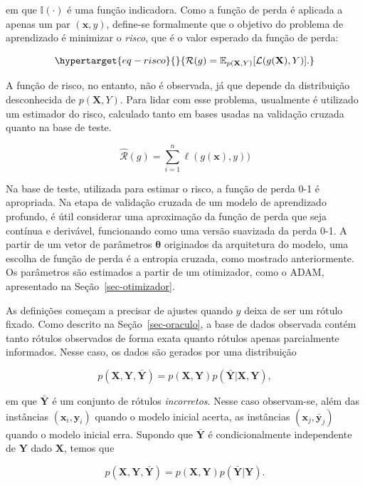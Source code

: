 \documentclass[12pt,twoside,brazilian]{book}
\begin{document}
em que \(\mathbb I(\cdot)\) é uma função indicadora. Como a função de
perda é aplicada a apenas um par \((\mathbf x,y)\), define-se
formalmente que o objetivo do problema de aprendizado é minimizar o
\emph{risco}, que é o valor esperado da função de perda:

\begin{equation}\protect\hypertarget{eq-risco}{}{
\mathcal R(g) = \mathbb E_{p(\mathbf X,Y)}[\mathcal L(g(\mathbf X),Y)].
}\label{eq-risco}\end{equation}

A função de risco, no entanto, não é observada, já que depende da
distribuição desconhecida de \(p(\mathbf X,Y)\). Para lidar com esse
problema, usualmente é utilizado um estimador do risco, calculado tanto
em bases usadas na validação cruzada quanto na base de teste.

\[
\hat{\mathcal R}(g) = \sum_{i=1}^n \ell(g(\mathbf x),y))
\]

Na base de teste, utilizada para estimar o risco, a função de perda 0-1
é apropriada. Na etapa de validação cruzada de um modelo de aprendizado
profundo, é útil considerar uma aproximação da função de perda que seja
contínua e derivável, funcionando como uma versão suavizada da perda
0-1. A partir de um vetor de parâmetros \(\boldsymbol \theta\)
originados da arquitetura do modelo, uma escolha de função de perda é a
entropia cruzada, como mostrado anteriormente. Os parâmetros são
estimados a partir de um otimizador, como o ADAM, apresentado na
Seção~\ref{sec-otimizador}.

As definições começam a precisar de ajustes quando \(y\) deixa de ser um
rótulo fixado. Como descrito na Seção~\ref{sec-oraculo}, a base de dados
observada contém tanto rótulos observados de forma exata quanto rótulos
apenas parcialmente informados. Nesse caso, os dados são gerados por uma
distribuição

\[
p(\mathbf X,\mathbf Y,\bar{\mathbf Y})=p(\mathbf X, \mathbf Y)p(\bar{\mathbf Y}|\mathbf X,\mathbf Y),
\]

em que \(\bar{\mathbf Y}\) é um conjunto de rótulos \emph{incorretos}.
Nesse caso observam-se, além das instâncias
\((\mathbf x_i,\mathbf y_i)\) quando o modelo inicial acerta, as
instâncias \((\mathbf x_j, \bar{\mathbf {y}}_j)\) quando o modelo
inicial erra. Supondo que \(\bar{\mathbf Y}\) é condicionalmente
independente de \({\mathbf Y}\) dado \({\mathbf X}\), temos que

\[
p(\mathbf X,\mathbf Y,\bar{\mathbf Y})=p(\mathbf X, \mathbf Y)p(\bar{\mathbf Y}|\mathbf Y).
\]
\end{document}
